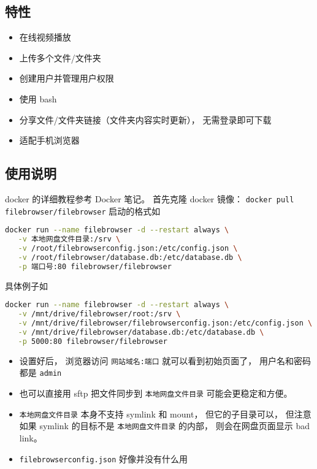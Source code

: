 
\begin{issues}
\issueDraft
\end{issues}

\subsection{特性}
\begin{itemize}
\item 在线视频播放
\item 上传多个文件/文件夹
\item 创建用户并管理用户权限
\item 使用 bash
\item 分享文件/文件夹链接（文件夹内容实时更新）， 无需登录即可下载
\item 适配手机浏览器
\end{itemize}

\subsection{使用说明}
docker 的详细教程参考 Docker 笔记。 首先克隆 docker 镜像： \verb|docker pull filebrowser/filebrowser|
启动的格式如
\begin{lstlisting}[language=bash]
docker run --name filebrowser -d --restart always \
   -v 本地网盘文件目录:/srv \
   -v /root/filebrowserconfig.json:/etc/config.json \
   -v /root/filebrowser/database.db:/etc/database.db \
   -p 端口号:80 filebrowser/filebrowser
\end{lstlisting}
具体例子如 %
\begin{lstlisting}[language=bash]
docker run --name filebrowser -d --restart always \
   -v /mnt/drive/filebrowser/root:/srv \
   -v /mnt/drive/filebrowser/filebrowserconfig.json:/etc/config.json \
   -v /mnt/drive/filebrowser/database.db:/etc/database.db \
   -p 5000:80 filebrowser/filebrowser
\end{lstlisting}

\begin{itemize}
\item 设置好后， 浏览器访问 \verb`网站域名:端口` 就可以看到初始页面了， 用户名和密码都是 \verb`admin`
\item 也可以直接用 sftp 把文件同步到 \verb`本地网盘文件目录` 可能会更稳定和方便。
\item \verb`本地网盘文件目录` 本身不支持 symlink 和 mount， 但它的子目录可以， 但注意如果 symlink 的目标不是 \verb|本地网盘文件目录| 的内部， 则会在网盘页面显示 bad link。
\item \verb|filebrowserconfig.json| 好像并没有什么用
\end{itemize}
